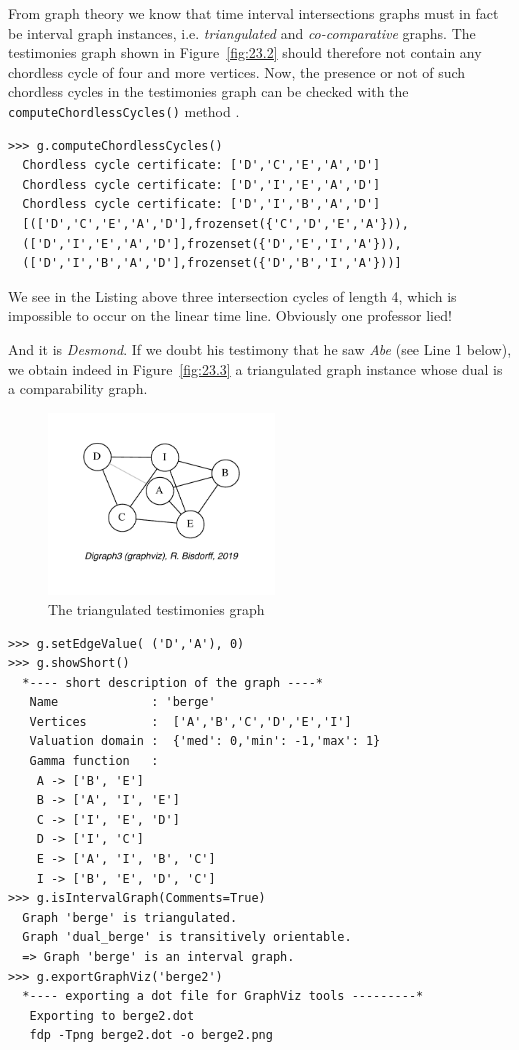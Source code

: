 From graph theory we know that time interval intersections graphs must in fact be interval graph instances, i.e. \emph{triangulated} and \emph{co-comparative} graphs. The testimonies graph shown in Figure~\vref{fig:23.2} should therefore not contain any chordless cycle of four and more vertices. Now, the presence or not of such chordless cycles in the testimonies graph can be checked with the \texttt{computeChordlessCycles()} method \citep{BIS-2010}.
\begin{lstlisting}
>>> g.computeChordlessCycles()
  Chordless cycle certificate: ['D','C','E','A','D']
  Chordless cycle certificate: ['D','I','E','A','D']
  Chordless cycle certificate: ['D','I','B','A','D']
  [(['D','C','E','A','D'],frozenset({'C','D','E','A'})),
  (['D','I','E','A','D'],frozenset({'D','E','I','A'})),
  (['D','I','B','A','D'],frozenset({'D','B','I','A'}))]
\end{lstlisting}
We see in the Listing above three intersection cycles of length 4, which is impossible to occur on the linear time line. Obviously one professor lied!

And it is \emph{Desmond}. If we doubt his testimony that he saw \emph{Abe} (see Line 1 below), we obtain indeed in Figure~\vref{fig:23.3} a triangulated graph instance whose dual is a comparability graph.
\begin{figure}[ht]
\sidecaption[t]
\includegraphics[width=6cm]{Figures/23-3-berge2.pdf}
\caption{The triangulated testimonies graph} 
\label{fig:23.3}       %
\end{figure}
\begin{lstlisting}
>>> g.setEdgeValue( ('D','A'), 0)
>>> g.showShort()
  *---- short description of the graph ----*
   Name             : 'berge'
   Vertices         :  ['A','B','C','D','E','I']
   Valuation domain :  {'med': 0,'min': -1,'max': 1}
   Gamma function   : 
    A -> ['B', 'E']
    B -> ['A', 'I', 'E']
    C -> ['I', 'E', 'D']
    D -> ['I', 'C']
    E -> ['A', 'I', 'B', 'C']
    I -> ['B', 'E', 'D', 'C']
>>> g.isIntervalGraph(Comments=True)
  Graph 'berge' is triangulated.
  Graph 'dual_berge' is transitively orientable.
  => Graph 'berge' is an interval graph.
>>> g.exportGraphViz('berge2')
  *---- exporting a dot file for GraphViz tools ---------*
   Exporting to berge2.dot
   fdp -Tpng berge2.dot -o berge2.png
\end{lstlisting}

